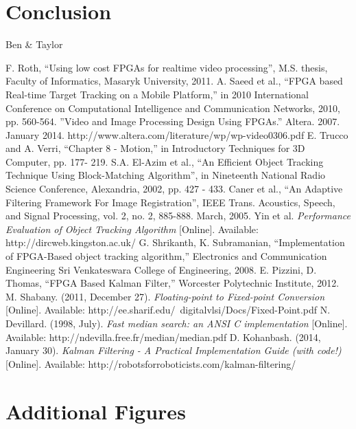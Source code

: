 \documentclass[12pt]{article} %
\begin{document}
\section{Conclusion}
Ben \& Taylor
\newpage
\begin{thebibliography}{11}
F. Roth, “Using low cost FPGAs for realtime video processing”, M.S. thesis, Faculty of Informatics, Masaryk University, 2011.
A. Saeed et al., “FPGA based Real-time Target Tracking on a Mobile Platform,” in 2010 International Conference on Computational Intelligence and Communication Networks, 2010, pp. 560-564.
”Video and Image Processing Design Using FPGAs.” Altera. 2007. January 2014. 
http://www.altera.com/literature/wp/wp-video0306.pdf  
E. Trucco and A. Verri, “Chapter 8 - Motion,” in Introductory Techniques for 3D Computer, pp. 177- 219.
S.A. El-Azim et al., “An Efficient Object Tracking Technique Using Block-Matching Algorithm”, in Nineteenth National Radio Science Conference, Alexandria, 2002, pp. 427 - 433.
Caner et al., “An Adaptive Filtering Framework For Image Registration”, IEEE Trans. Acoustics, Speech, and Signal Processing, vol. 2, no. 2, 885-888. March, 2005. 
Yin et al. \textit{Performance Evaluation of Object Tracking Algorithm} [Online]. Available: http://dircweb.kingston.ac.uk/ 
G. Shrikanth, K. Subramanian, “Implementation of FPGA-Based object tracking algorithm,” Electronics and Communication Engineering Sri Venkateswara College of Engineering, 2008.
E. Pizzini, D. Thomas, “FPGA Based Kalman Filter,” Worcester Polytechnic Institute, 2012.
M. Shabany. (2011, December 27). \textit{Floating-point to Fixed-point Conversion} [Online]. Available: http://ee.sharif.edu/~digitalvlsi/Docs/Fixed-Point.pdf
N. Devillard. (1998, July). \textit{Fast median search: an ANSI C implementation} [Online]. Available: http://ndevilla.free.fr/median/median.pdf
D. Kohanbash. (2014, January 30). \textit{Kalman Filtering - A Practical Implementation Guide (with code!)} [Online]. Available: http://robotsforroboticists.com/kalman-filtering/
\end{thebibliography}
\newpage
\appendix
\appendixpage
\section{Additional Figures} \label{sec:add}
\end{document}
